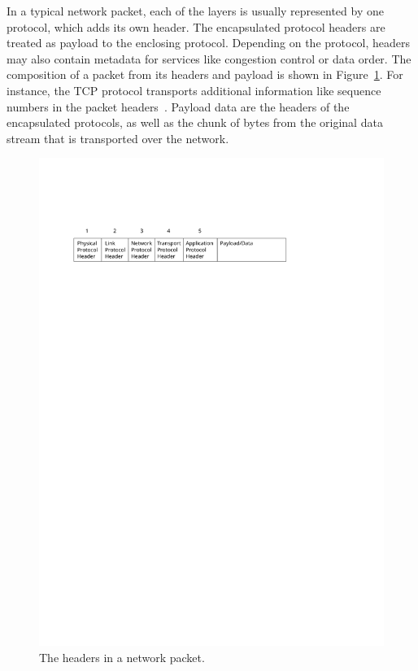 \documentclass[a4paper,
		12pt,
		parskip=full,
		titlepage
		]{scrartcl}
\begin{document}
In a typical network packet, each of the layers is usually represented 
by one protocol, which adds its own header.
The encapsulated protocol headers are treated as payload to the enclosing protocol.
Depending on the protocol, headers may also contain metadata for services like congestion control or data order.
The composition of a packet from its headers and payload is shown in Figure~\ref{fig:packet-headers}.
For instance, the TCP protocol transports additional information like sequence 
numbers in the packet headers~\cite[Chapter 3.5]{kurose_ross}.
Payload data are the headers of the encapsulated protocols, as well as the chunk 
of bytes from the original data stream that is transported over the network.

\begin{figure}
\centering
\includegraphics[width=\textwidth]{images/packet-headers}
\caption{The headers in a network packet.}
\label{fig:packet-headers}
\end{figure}
\end{document}
